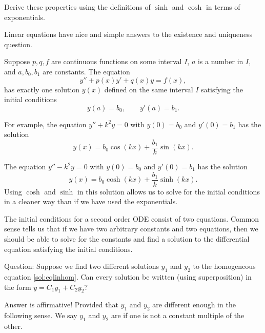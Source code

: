 \begin{exercise}
Derive these properties using the definitions of $\sinh$
and $\cosh$ in terms of exponentials.
\end{exercise}


Linear equations have nice and simple
answers to the existence and uniqueness question.

\begin{theorem}
Suppose $p, q, f$ are continuous functions on some interval
$I$, $a$ is a number in $I$,
and $a, b_0, b_1$ are constants.
The equation
\begin{equation*}
y'' + p(x) y' + q(x) y = f(x) ,
\end{equation*}
has exactly one solution $y(x)$ defined on the same interval $I$ satisfying the initial conditions
\begin{equation*}
y(a) = b_0 , \qquad y'(a) = b_1 .
\end{equation*}
\end{theorem}

For example, the equation $y'' + k^2 y = 0$ with $y(0) = b_0$ and $y'(0) = b_1$
has the solution
\begin{equation*}
y(x) = b_0 \cos (kx) + \frac{b_1}{k} \sin (kx) .
\end{equation*}

The equation $y'' - k^2 y = 0$ with $y(0) = b_0$ and $y'(0) = b_1$
has the solution
\begin{equation*}
y(x) = b_0 \cosh (kx) + \frac{b_1}{k} \sinh (kx) .
\end{equation*}
Using $\cosh$ and $\sinh$ in this solution allows us to solve for
the initial conditions
in a cleaner way
than if we have used the exponentials.

\medskip

The initial conditions for a second order ODE consist of two
equations.  Common sense tells us that
if we have two arbitrary constants and two equations, then we should 
be able to solve
for the constants and find a solution to the differential equation
satisfying the initial conditions.

Question: Suppose we find two different solutions $y_1$ and $y_2$ to the
homogeneous equation \eqref{sol:eqlinhom}.  Can every solution
be written (using superposition) in the form
$y = C_1 y_1 + C_2 y_2$?

Answer is affirmative!  Provided that $y_1$ and $y_2$ are different enough in
the following sense.  We say $y_1$ and $y_2$ are \emph{} if one is not a constant multiple of the other.

